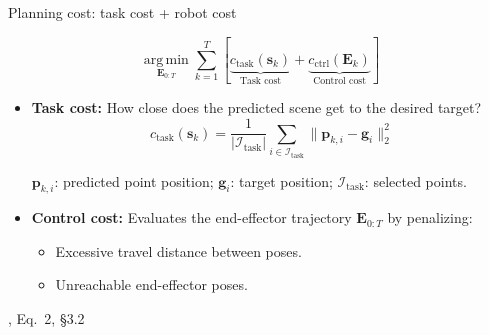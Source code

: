 \documentclass[aspectratio=169,12pt]{beamer}
\newcommand{\credit}[1]{\par\hfill{\tiny\color{mute}\citet{huang2026pointworld}, #1}\par}
\begin{document}
\begin{frame}{Planning cost: task cost + robot cost}

  \vspace{-8pt}
  \small
  \[
    \underset{\mathbf E_{0:T}}{\operatorname{arg\,min}}
    \sum_{k=1}^{T}
    \left[
      \underbrace{c_{\mathrm{task}}(\mathbf s_k)}_{\text{Task cost}}
      +
      \underbrace{c_{\mathrm{ctrl}}(\mathbf E_k)}_{\text{Control cost}}
    \right]
  \]

  \vspace{6pt}

  \begin{itemize}
    \footnotesize
    \setlength{\itemsep}{15pt}

    \item<1-> \textbf{Task cost:} How close does the
      predicted scene get to the desired target?
      \vspace{-4pt}
      \[
        c_{\mathrm{task}}(\mathbf s_k)
        =
        \frac{1}{|\mathcal I_{\mathrm{task}}|}
        \sum_{i\in\mathcal I_{\mathrm{task}}}
        \|\mathbf p_{k,i}-\mathbf g_i\|_2^2
      \]
      {\scriptsize
        $\mathbf p_{k,i}$: predicted point position;
        $\mathbf g_i$: target position;
        $\mathcal I_{\mathrm{task}}$: selected points.
      \par}

    \item<2-> \textbf{Control cost:}
      Evaluates the end-effector trajectory
      $\mathbf E_{0:T}$ by penalizing:
      \begin{itemize}
        \item Excessive travel distance between poses.
        \item Unreachable end-effector poses.
      \end{itemize}

  \end{itemize}

  \vfill


  \credit{Eq.~2, \S3.2}
\end{frame}



\end{document}
